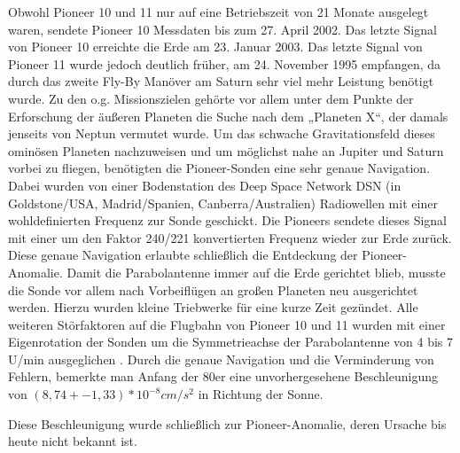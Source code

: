 Obwohl Pioneer 10 und 11 nur auf eine Betriebszeit von 21 Monate
ausgelegt waren, sendete Pioneer 10 Messdaten bis zum 27. April 2002.
Das letzte Signal von Pioneer 10 erreichte die Erde am 23. Januar 2003.
Das letzte Signal von Pioneer 11 wurde jedoch deutlich früher, am 24.
November 1995 empfangen, da durch das zweite Fly-By Manöver am Saturn
sehr viel mehr Leistung benötigt wurde.
Zu den o.g. Missionszielen gehörte vor allem unter dem Punkte der
Erforschung der äußeren Planeten die Suche nach dem „Planeten X“, der
damals jenseits von Neptun vermutet wurde. Um das schwache
Gravitationsfeld dieses ominösen Planeten nachzuweisen und um möglichst
nahe an Jupiter und Saturn vorbei zu fliegen, benötigten die
Pioneer-Sonden eine sehr genaue Navigation. Dabei wurden von einer
Bodenstation des Deep Space Network DSN (in Goldstone/USA,
Madrid/Spanien, Canberra/Australien) Radiowellen mit einer
wohldefinierten Frequenz zur Sonde geschickt. Die Pioneers sendete
dieses Signal mit einer um den Faktor 240/221 konvertierten Frequenz
wieder zur Erde zurück\cite{Dittus2006}. Diese genaue
Navigation erlaubte schließlich die Entdeckung der Pioneer-Anomalie. 
Damit die Parabolantenne immer auf die Erde gerichtet blieb, musste
die Sonde vor allem nach Vorbeiflügen an großen Planeten neu
ausgerichtet werden. Hierzu wurden kleine Triebwerke für eine kurze
Zeit gezündet. Alle weiteren Störfaktoren auf die Flugbahn von Pioneer
10 und 11 wurden mit einer Eigenrotation der Sonden um die
Symmetrieachse der Parabolantenne von 4 bis 7 U/min
ausgeglichen\cite{Dittus2006} \cite{Nieto2007}.
Durch die genaue Navigation und die Verminderung von Fehlern,
bemerkte man Anfang der 80er eine unvorhergesehene Beschleunigung von
$(8,74+-1,33)*10^{-8} cm/s^{2}$ \cite{Anderson2002}in Richtung der Sonne. 

Diese Beschleunigung wurde schließlich zur Pioneer-Anomalie, deren
Ursache bis heute nicht bekannt ist.
